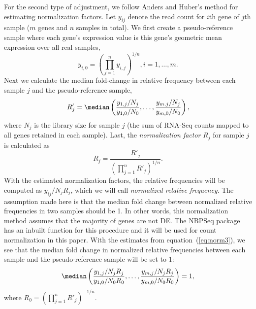 	For the second type of adjustment, we follow Anders and Huber's method
	\citep{anders2010differential} for 
	estimating normalization factors.  Let $y_{ij}$ denote the read count
	for $i$th gene of $j$th sample ($m$ genes and $n$ samples in total). We first
	create a pseudo-reference sample where each gene's expression value is this
	gene's geometric mean expression over all real samples,
	\begin{equation}
		y_{i,0} = (\prod_{j=1}^ny_{i,j})^{1/n},  i=1, \ldots, m. 
	\end{equation} 
	Next we calculate the median fold-change in relative frequency between
	each sample $j$ and the pseudo-reference sample,
	\begin{equation}\label{eq:normfactors} 
		R'_j = \median \left(\dfrac{y_{1,j}/N_j}{y_{1,0}/N_{0}}, \ldots, \dfrac{y_{m,j}/N_j}{y_{m,0}/N_{0}}\right),
	\end{equation}
	where $N_j$ is the library size for sample $j$ (the sum of RNA-Seq
	counts mapped to all genes retained in each sample). Last, the
	\textit{normalization factor}  $R_j$ for sample $j$ is calculated as 
	\begin{equation}
		\label{eq:norm3}
		R_j = \dfrac{R'_j}{(\prod_{j=1}^{n}R'_j)^{1/n}}.
	\end{equation}
	With the estimated normalization factors, the relative frequencies will be
	computed as $y_{ij}/{N_j R_j}$, which we will call {\em normalized relative
		frequency}. The assumption made here is that the
	median fold change between normalized relative frequencies in two samples should be 1. In
	other words, this normalization method assumes that the majority of genes are
	not DE. The NBPSeq package \citep{di2014package} has an inbuilt function for
	this procedure and it will be used for count normalization in this paper. With
	the estimates from equation~(\ref{eq:norm3}), we see that the median fold
	change in normalized relative frequencies between each sample and the pseudo-reference
	sample will be set to 1:
	\begin{equation}
		\label{eq:medianfc}
		\median \left(\dfrac{y_{1,j}/ N_jR_j}{y_{1,0}/N_{0}R_0}, \ldots,
		\dfrac{y_{m,j}/N_j R_j}{y_{m,0}/N_{0}R_0} \right) = 1,
	\end{equation}
	where $R_0 = (\prod_{j=1}^{n}R'_j)^{-1/n}$.
	
	
